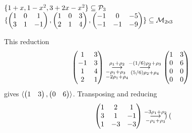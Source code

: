 \begin{exercises}
\begin{exparts}
      \partsitem \(  \set{1+x,1-x^2,3+2x-x^2}\subseteq\polyspace_3  \)
      \partsitem \( \set{
          \begin{pmatrix}
            1  &0  &1  \\
            3  &1  &-1
          \end{pmatrix},
          \begin{pmatrix}
            1  &0  &3  \\
            2  &1  &4
          \end{pmatrix},
          \begin{pmatrix}
           -1  &0  &-5 \\
           -1  &-1 &-9
          \end{pmatrix}  }  \subseteq\matspace_{\nbym{2}{3}}  \)
    \end{exparts}
    \begin{answer}
      \begin{exparts}
        \partsitem This reduction
          \begin{equation*}
             \begin{pmatrix}
               1  &3  \\
              -1  &3  \\
               1  &4  \\
               2  &1
             \end{pmatrix}
             \grstep[-\rho_1+\rho_3 \\ -2\rho_1+\rho_4]{\rho_1+\rho_2}
             \grstep[(5/6)\rho_2+\rho_4]{-(1/6)\rho_2+\rho_3}
             \begin{pmatrix}
               1  &3  \\
               0  &6  \\
               0  &0  \\
               0  &0
             \end{pmatrix}
          \end{equation*}
          gives \( \sequence{\rowvec{1 &3},\rowvec{0 &6}} \).
        \partsitem Transposing and reducing
          \begin{equation*}
             \begin{pmatrix}
               1  &2  &1  \\
               3  &1  &-1 \\
               1  &-3 &-3
             \end{pmatrix}
             \grstep[-\rho_1+\rho_3]{-3\rho_1+\rho_2}
             \begin{pmatrix}

\end{pmatrix}
\end{equation*}
\end{exparts}
\end{answer}
\end{exercises}
